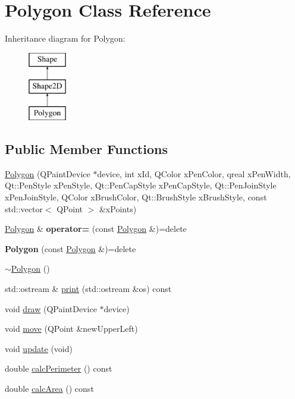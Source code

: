 \hypertarget{classPolygon}{\section{Polygon Class Reference}
\label{classPolygon}
}
Inheritance diagram for Polygon\-:\begin{figure}[H]
\begin{center}
\leavevmode
\includegraphics[height=3.000000cm]{classPolygon}
\end{center}
\end{figure}
\subsection*{Public Member Functions}
\begin{DoxyCompactItemize}
\item 
\hyperlink{classPolygon_a0a64a72fe34ecf25776b1bf0b33af9c9}{Polygon} (Q\-Paint\-Device $\ast$device, int x\-Id, Q\-Color x\-Pen\-Color, qreal x\-Pen\-Width, Qt\-::\-Pen\-Style x\-Pen\-Style, Qt\-::\-Pen\-Cap\-Style x\-Pen\-Cap\-Style, Qt\-::\-Pen\-Join\-Style x\-Pen\-Join\-Style, Q\-Color x\-Brush\-Color, Qt\-::\-Brush\-Style x\-Brush\-Style, const std\-::vector$<$ Q\-Point $>$ \&x\-Points)
\item 
\hypertarget{classPolygon_af39b679040579defec4a84276303c8f3}{\hyperlink{classPolygon}{Polygon} \& {\bfseries operator=} (const \hyperlink{classPolygon}{Polygon} \&)=delete}\label{classPolygon_af39b679040579defec4a84276303c8f3}

\item 
\hypertarget{classPolygon_a34540c02f39c27d1f140f47a92f58afb}{{\bfseries Polygon} (const \hyperlink{classPolygon}{Polygon} \&)=delete}\label{classPolygon_a34540c02f39c27d1f140f47a92f58afb}

\item 
\hyperlink{classPolygon_ace39c67107966db12e13a183f496c3b0}{$\sim$\-Polygon} ()
\item 
std\-::ostream \& \hyperlink{classPolygon_ae1d7135748131313fac844463013931e}{print} (std\-::ostream \&os) const 
\item 
void \hyperlink{classPolygon_a7161b79ad403b975423f73e0cd073343}{draw} (Q\-Paint\-Device $\ast$device)
\item 
void \hyperlink{classPolygon_a8972edcc7d98e79ac828905c4a52a272}{move} (Q\-Point \&new\-Upper\-Left)
\item 
void \hyperlink{classPolygon_a723d9ffbebe8964da953dcd52aafeec2}{update} (void)
\item 
double \hyperlink{classPolygon_a6756ed58b8fabebf1f02c89ea821fe78}{calc\-Perimeter} () const 
\item 
double \hyperlink{classPolygon_ac325f8f1af8622d7314b887b31603ba1}{calc\-Area} () const 
\end{DoxyCompactItemize}

